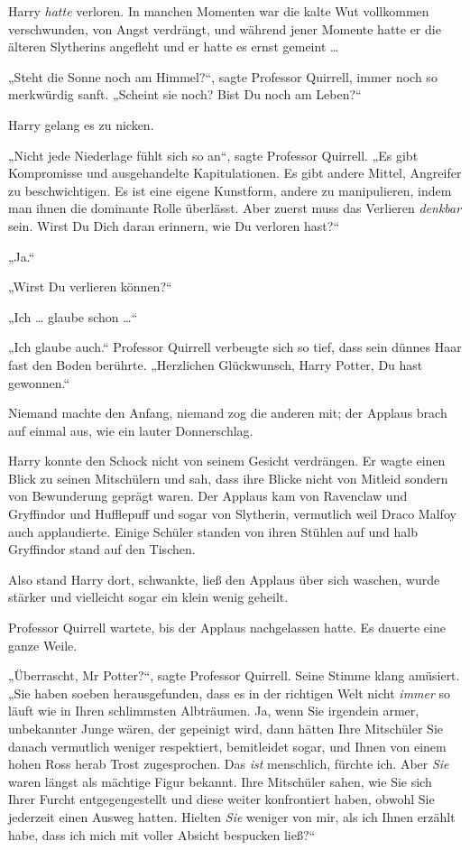 {Harry \emph{hatte} verloren. In manchen Momenten war die kalte Wut vollkommen verschwunden, von Angst verdrängt, und während jener Momente hatte er die älteren Slytherins angefleht und er hatte es ernst gemeint …

„Steht die Sonne noch am Himmel?“, sagte Professor Quirrell, immer noch so merkwürdig sanft. „Scheint sie noch? Bist Du noch am Leben?“

Harry gelang es zu nicken.

„Nicht jede Niederlage fühlt sich so an“, sagte Professor Quirrell. „Es gibt Kompromisse und ausgehandelte Kapitulationen. Es gibt andere Mittel, Angreifer zu beschwichtigen. Es ist eine eigene Kunstform, andere zu manipulieren, indem man ihnen die dominante Rolle überlässt. Aber zuerst muss das Verlieren \emph{denkbar} sein. Wirst Du Dich daran erinnern, wie Du verloren hast?“

„Ja.“

„Wirst Du verlieren können?“

„Ich … glaube schon …“

„Ich glaube auch.“ Professor Quirrell verbeugte sich so tief, dass sein dünnes Haar fast den Boden berührte. „Herzlichen Glückwunsch, Harry Potter, Du hast gewonnen.“

Niemand machte den Anfang, niemand zog die anderen mit; der Applaus brach auf einmal aus, wie ein lauter Donnerschlag.

Harry konnte den Schock nicht von seinem Gesicht verdrängen. Er wagte einen Blick zu seinen Mitschülern und sah, dass ihre Blicke nicht von Mitleid sondern von Bewunderung geprägt waren. Der Applaus kam von Ravenclaw und Gryffindor und Hufflepuff und sogar von Slytherin, vermutlich weil Draco Malfoy auch applaudierte. Einige Schüler standen von ihren Stühlen auf und halb Gryffindor stand auf den Tischen.

Also stand Harry dort, schwankte, ließ den Applaus über sich waschen, wurde stärker und vielleicht sogar ein klein wenig geheilt.

Professor Quirrell wartete, bis der Applaus nachgelassen hatte. Es dauerte eine ganze Weile.

„Überrascht, Mr Potter?“, sagte Professor Quirrell. Seine Stimme klang amüsiert. „Sie haben soeben herausgefunden, dass es in der richtigen Welt nicht \emph{immer} so läuft wie in Ihren schlimmsten Albträumen. Ja, wenn Sie irgendein armer, unbekannter Junge wären, der gepeinigt wird, dann hätten Ihre Mitschüler Sie danach vermutlich weniger respektiert, bemitleidet sogar, und Ihnen von einem hohen Ross herab Trost zugesprochen. Das \emph{ist} menschlich, fürchte ich. Aber \emph{Sie} waren längst als mächtige Figur bekannt. Ihre Mitschüler sahen, wie Sie sich Ihrer Furcht entgegengestellt und diese weiter konfrontiert haben, obwohl Sie jederzeit einen Ausweg hatten. Hielten \emph{Sie} weniger von mir, als ich Ihnen erzählt habe, dass ich mich mit voller Absicht bespucken ließ?“

}
